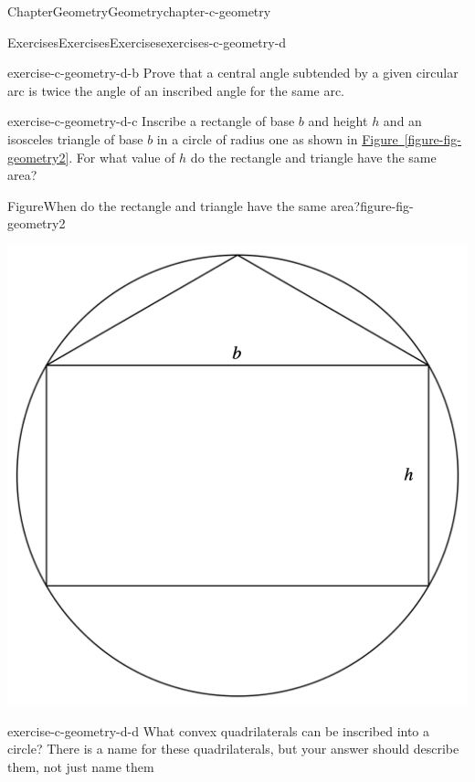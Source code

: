 \documentclass[oneside,10pt,]{book}
\newcommand{\xreffont}{\relax}
\numberwithin{equation}{section}
\begin{document}
\begin{chapterptx}{Chapter}{Geometry}{}{Geometry}{}{}{chapter-c-geometry}
\begin{exercises-section}{Exercises}{Exercises}{}{Exercises}{}{}{exercises-c-geometry-d}
\begin{divisionexercise}{1}{}{}{exercise-c-geometry-d-b}%
Prove that a central angle subtended by a given circular arc is twice the angle of an inscribed angle for the same arc.%
\end{divisionexercise}%
\begin{divisionexercise}{2}{}{}{exercise-c-geometry-d-c}%
Inscribe a rectangle of base \(b\) and height \(h\) and an isosceles triangle of base \(b\) in a circle of radius one as shown in \hyperref[figure-fig-geometry2]{Figure~{\xreffont\ref{figure-fig-geometry2}}}. For what value of \(h\) do the rectangle and triangle have the same area?%
\begin{figureptx}{Figure}{When do the rectangle and triangle have the same area?}{figure-fig-geometry2}{}%
\begin{image}{0.2}{0.6}{0.2}%
\includegraphics[width=\linewidth]{images/fig-geometry2.png}
\end{image}%
\tcblower
\end{figureptx}%
\end{divisionexercise}%
\begin{divisionexercise}{3}{}{}{exercise-c-geometry-d-d}%
What convex quadrilaterals can be inscribed into a circle? There is a name for these quadrilaterals, but your answer should describe them, not just name them%
\end{divisionexercise}%

\end{exercises-section}
\end{chapterptx}
\end{document}
